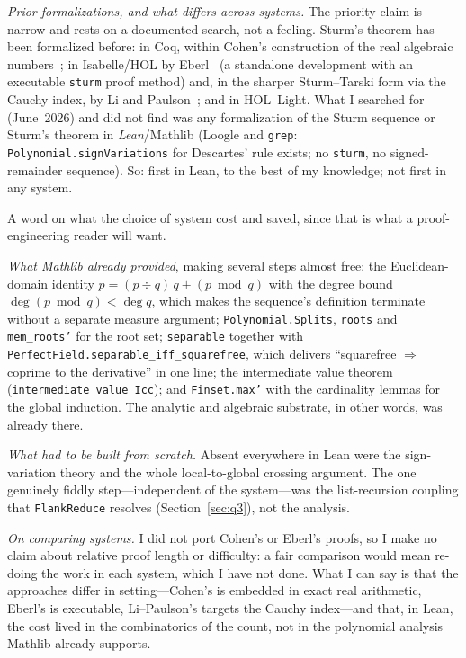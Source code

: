 \documentclass[11pt]{article}
\newcommand{\lean}[1]{\texttt{#1}}
\begin{document}
\emph{Prior formalizations, and what differs across systems.} The priority claim is narrow and
rests on a documented search, not a feeling. Sturm's theorem has been formalized before: in Coq,
within Cohen's construction of the real algebraic numbers~\cite{cohen}; in Isabelle/HOL by
Eberl~\cite{eberl} (a standalone development with an executable \lean{sturm} proof method) and, in
the sharper Sturm--Tarski form via the Cauchy index, by Li and Paulson~\cite{litarski,libudan}; and
in HOL~Light. What I searched for (June~2026) and did not find was any formalization of the Sturm
sequence or Sturm's theorem in \emph{Lean}/Mathlib (Loogle and \lean{grep}:
\lean{Polynomial.signVariations} for Descartes' rule exists; no \lean{sturm}, no signed-remainder
sequence). So: first in Lean, to the best of my knowledge; not first in any system.

A word on what the choice of system cost and saved, since that is what a proof-engineering reader
will want.

\emph{What Mathlib already provided}, making several steps almost free: the Euclidean-domain
identity $p = (p\div q)\,q + (p\bmod q)$ with the degree bound $\deg(p\bmod q)<\deg q$, which makes
the sequence's definition terminate without a separate measure argument; \lean{Polynomial.Splits},
\lean{roots} and \lean{mem\_roots'} for the root set; \lean{separable} together with
\lean{PerfectField.separable\_iff\_squarefree}, which delivers ``squarefree $\Rightarrow$ coprime to
the derivative'' in one line; the intermediate value theorem (\lean{intermediate\_value\_Icc}); and
\lean{Finset.max'} with the cardinality lemmas for the global induction. The analytic and algebraic
substrate, in other words, was already there.

\emph{What had to be built from scratch.} Absent everywhere in Lean were the sign-variation theory
and the whole local-to-global crossing argument. The one genuinely fiddly step---independent of the
system---was the list-recursion coupling that \lean{FlankReduce} resolves (Section~\ref{sec:q3}),
not the analysis.

\emph{On comparing systems.} I did not port Cohen's or Eberl's proofs, so I make no claim about
relative proof length or difficulty: a fair comparison would mean re-doing the work in each system,
which I have not done. What I can say is that the approaches differ in setting---Cohen's is embedded
in exact real arithmetic, Eberl's is executable, Li--Paulson's targets the Cauchy index---and that,
in Lean, the cost lived in the combinatorics of the count, not in the polynomial analysis Mathlib
already supports.
\end{document}
